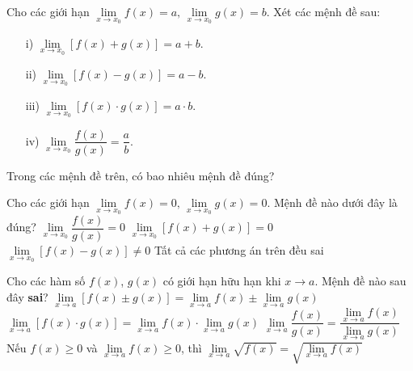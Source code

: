 \begin{ex}%
	Cho các giới hạn $\lim\limits_{x \rightarrow x_0} f(x)=a,\, \lim\limits_{x \rightarrow x_0} g(x) = b$. Xét các mệnh đề sau:
	\begin{enumerate}
		\item[i)] $\lim\limits_{x\rightarrow x_0}\left[f(x) + g(x)\right]=a+b$.
		\item[ii)] $\lim\limits_{x\rightarrow x_0}\left[f(x) - g(x)\right]=a - b$.
		\item[iii)] $\lim\limits_{x\rightarrow x_0}\left[f(x) \cdot g(x)\right]=a\cdot b$.
		\item[iv)] $\lim\limits_{x\rightarrow x_0} \dfrac{f(x)}{g(x)}= \dfrac{a}{b}$.
	\end{enumerate}
	Trong các mệnh đề trên, có bao nhiêu mệnh đề đúng?
\end{ex}

\begin{ex}%
	Cho các giới hạn $\lim\limits_{x \rightarrow x_0} f(x)= 0,\, \lim\limits_{x \rightarrow x_0} g(x) = 0$. Mệnh đề nào dưới đây là đúng?
	\choice
	{$\lim\limits_{x \rightarrow x_0} \dfrac{f(x)}{g(x)} = 0$}
	{\True $\lim\limits_{x \rightarrow x_0} \left[f(x) + g(x)\right] = 0$}
	{$\lim\limits_{x \rightarrow x_0} \left[f(x) - g(x)\right] \neq 0$}
	{Tất cả các phương án trên đều sai}
\end{ex}
\begin{ex}%
	Cho các hàm số $f(x)$, $g(x)$ có giới hạn hữu hạn khi $x\to a$. Mệnh đề nào sau đây \textbf{sai}?
	\choice
	{$\lim\limits_{x\to a}[f(x)\pm g(x)]=\lim\limits_{x\to a}f(x)\pm \lim\limits_{x\to a}g(x)$}
	{$\lim\limits_{x\to a}[f(x)\cdot g(x)]=\lim\limits_{x\to a}f(x)\cdot\lim\limits_{x\to a}g(x)$}
	{\True $\lim\limits_{x\to a}\dfrac{f(x)}{g(x)}=\dfrac{\lim\limits_{x\to a}f(x)}{\lim\limits_{x\to a}g(x)}$}
	{Nếu $f(x)\geq0$ và $\lim\limits_{x\to a}f(x)\geq0$, thì $\lim\limits_{x\to a}\sqrt{f(x)}=\sqrt{\lim\limits_{x\to a}f(x)}$}
\end{ex}

